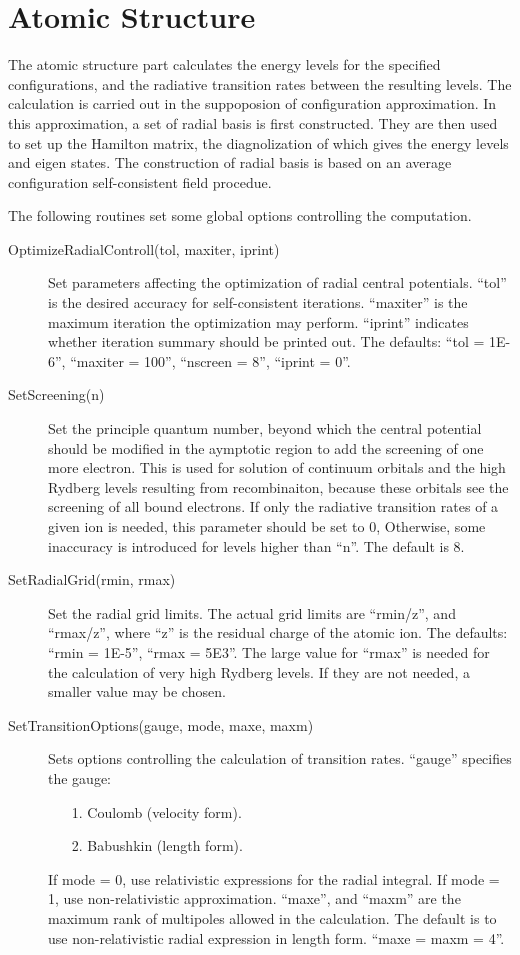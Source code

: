 \documentclass[12pt]{article}
\begin{document}
\section{Atomic Structure}
The atomic structure part calculates the energy levels for the specified
configurations, and the radiative transition rates between the resulting
levels. The calculation is carried out in the suppoposion of configuration
approximation. In this approximation, a set of radial basis is first
constructed. They are then used to set up the Hamilton matrix, the
diagnolization of which gives the energy levels and eigen states. The
construction of radial basis is based on an average configuration
self-consistent field procedue. 

The following routines set some global options controlling the computation.
\begin{description}
\item[OptimizeRadialControll(tol, maxiter, iprint)] 
Set parameters affecting the optimization of radial central potentials. 
``tol'' is the desired accuracy for self-consistent iterations. ``maxiter'' is
the maximum iteration the optimization may perform. ``iprint'' indicates
whether iteration summary should 
be printed out. The defaults: ``tol = 1E-6'', ``maxiter = 100'', ``nscreen =
8'', ``iprint = 0''.

\item[SetScreening(n)] 
Set the principle quantum number, beyond which the central potential should be
modified in the aymptotic region to add the screening of one more
electron. This is used for solution of continuum orbitals and the high Rydberg
levels resulting from recombinaiton, because these orbitals see the screening
of all bound electrons. If only the radiative transition rates of a given ion
is needed, this parameter should be set to 0, Otherwise, some inaccuracy is
introduced for levels higher than ``n''. The default is 8.

\item[SetRadialGrid(rmin, rmax)]
Set the radial grid limits. The actual grid limits are ``rmin/z'', and 
``rmax/z'', where ``z'' is the residual charge of the atomic ion. The
defaults: ``rmin = 1E-5'', ``rmax = 5E3''. The large value for ``rmax'' is
needed for the calculation of very high Rydberg levels. If they are not needed,
a smaller value may be chosen. 

\item[SetTransitionOptions(gauge, mode, maxe, maxm)] Sets options controlling
the calculation of transition rates. ``gauge'' specifies the gauge: 
\begin{enumerate}
\item[1.] Coulomb (velocity form).
\item[2.] Babushkin (length form). 
\end{enumerate}
If mode = 0, use relativistic expressions
for the radial integral. If mode = 1, use non-relativistic approximation. 
``maxe'', and ``maxm'' are the maximum rank of multipoles allowed in the
calculation. The default is to use non-relativistic radial expression in
length form. ``maxe = maxm = 4''. 


\end{description}
\end{document}
